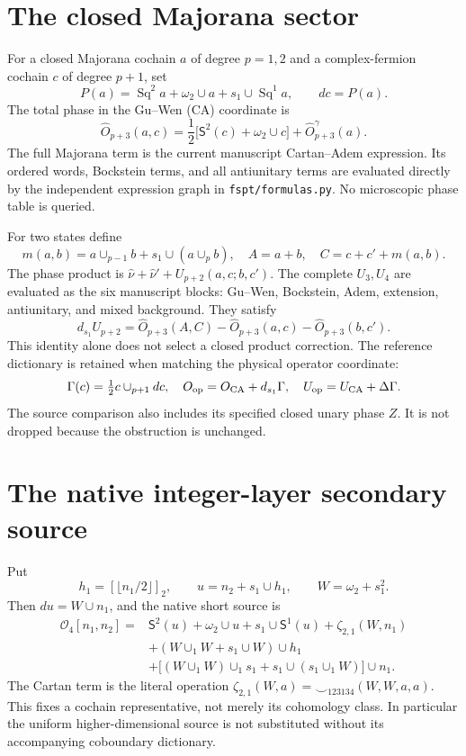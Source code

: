 \documentclass[11pt]{article}
\newcommand{\Sq}{\operatorname{Sq}}
\newcommand{\SSq}{\mathsf S}
\newcommand{\dd}{d_{s_1}}
\begin{document}
\section{The closed Majorana sector}
For a closed Majorana cochain $a$ of degree $p=1,2$ and a complex-fermion
cochain $c$ of degree $p+1$, set
\begin{equation}
 P(a)=\Sq^2a+\omega_2\cup a+s_1\cup\Sq^1a,
 \qquad dc=P(a).
\end{equation}
The total phase in the Gu--Wen (CA) coordinate is
\begin{equation}
 \widehat O_{p+3}(a,c)=\frac12\bigl[\SSq^2(c)+\omega_2\cup c\bigr]
 +\widehat O^\gamma_{p+3}(a).
\end{equation}
The full Majorana term is the current manuscript Cartan--Adem expression.
Its ordered words, Bockstein terms, and all antiunitary terms are evaluated
directly by the independent expression graph in \texttt{fspt/formulas.py}.
No microscopic phase table is queried.

For two states define
\begin{equation}
 m(a,b)=a\cup_{p-1}b+s_1\cup(a\cup_p b),\quad
 A=a+b,\quad C=c+c'+m(a,b).
\end{equation}
The phase product is
$\widehat\nu+\widehat\nu'+U_{p+2}(a,c;b,c')$.
The complete $U_3,U_4$ are evaluated as the six manuscript blocks:
Gu--Wen, Bockstein, Adem, extension, antiunitary, and mixed background.
They satisfy
\begin{equation}
 \dd U_{p+2}=\widehat O_{p+3}(A,C)
 -\widehat O_{p+3}(a,c)-\widehat O_{p+3}(b,c').
\end{equation}
This identity alone does not select a closed product correction.
The reference dictionary is retained when matching the physical operator
coordinate:
\begin{equation}
 \Gamma(c)=\tfrac12c\cup_{p+1}dc,\quad
 O_{\rm op}=O_{\rm CA}+\dd\Gamma,\quad
 U_{\rm op}=U_{\rm CA}+\Delta\Gamma.
\end{equation}
The source comparison also includes its specified closed unary phase $Z$.
It is not dropped because the obstruction is unchanged.

\section{The native integer-layer secondary source}
Put
\begin{equation}
 h_1=[\lfloor n_1/2\rfloor]_2,\qquad
 u=n_2+s_1\cup h_1,\qquad W=\omega_2+s_1^2.
\end{equation}
Then $du=W\cup n_1$, and the native short source is
\begin{align}
 \mathcal O_4[n_1,n_2]={}&\SSq^2(u)+\omega_2\cup u+s_1\cup\SSq^1(u)
 +\zeta_{2,1}(W,n_1)\nonumber\\
 &+(W\cup_1W+s_1\cup W)\cup h_1\nonumber\\
 &+\bigl[(W\cup_1W)\cup_1s_1+s_1\cup(s_1\cup_1W)\bigr]\cup n_1.
\end{align}
The Cartan term is the literal operation
$\zeta_{2,1}(W,a)=\smile_{123134}(W,W,a,a)$.
This fixes a cochain representative, not merely its cohomology class.
In particular the uniform higher-dimensional source is not substituted
without its accompanying coboundary dictionary.
\end{document}

